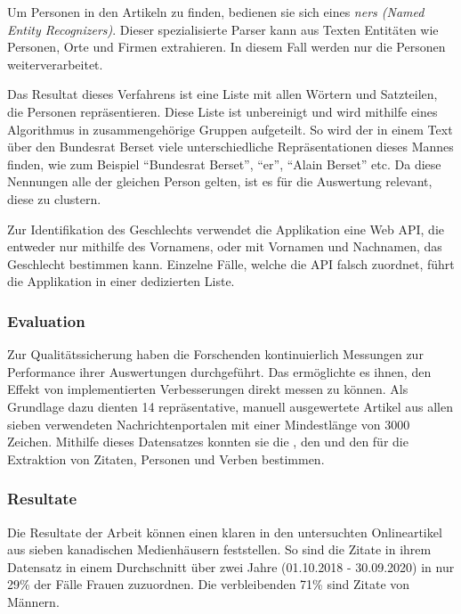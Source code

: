 Um Personen in den Artikeln zu finden, bedienen sie sich eines \textsl{\acrshort{ner}s (\textsl{Named Entity Recognizers})}. Dieser spezialisierte Parser kann aus Texten
Entitäten wie Personen, Orte und Firmen extrahieren. In diesem Fall werden nur die Personen weiterverarbeitet.

Das Resultat dieses Verfahrens ist eine Liste mit allen Wörtern und Satzteilen, die Personen repräsentieren. Diese Liste ist unbereinigt und
wird mithilfe eines  Algorithmus in zusammengehörige Gruppen aufgeteilt. So wird der  in einem Text über den
Bundesrat Berset viele unterschiedliche Repräsentationen dieses Mannes finden, wie zum Beispiel \enquote{Bundesrat Berset}, \enquote{er}, \enquote{Alain Berset}
etc. Da diese Nennungen alle der gleichen Person gelten, ist es für die Auswertung relevant, diese zu clustern.

Zur Identifikation des Geschlechts verwendet die Applikation eine Web API, die entweder nur mithilfe des Vornamens, oder mit Vornamen und Nachnamen, das Geschlecht
bestimmen kann. Einzelne Fälle, welche die API falsch zuordnet, führt die Applikation in einer dedizierten Liste.

\subsubsection{Evaluation}

Zur Qualitätssicherung haben die Forschenden kontinuierlich Messungen zur Performance ihrer Auswertungen durchgeführt. Das ermöglichte es ihnen, den Effekt von implementierten Verbesserungen
direkt messen zu können. Als Grundlage dazu dienten 14 repräsentative, manuell ausgewertete Artikel aus allen sieben verwendeten Nachrichtenportalen mit einer Mindestlänge von 3000 Zeichen.
Mithilfe dieses Datensatzes konnten sie die , den  und den  für die Extraktion von Zitaten, Personen und Verben bestimmen.

\subsubsection{Resultate}
Die Resultate der Arbeit können einen klaren  in den untersuchten
Onlineartikel aus sieben kanadischen Medienhäusern feststellen. So sind die Zitate in ihrem Datensatz
in einem Durchschnitt über zwei Jahre (01.10.2018 - 30.09.2020) in nur 29\% der Fälle Frauen zuzuordnen.
Die verbleibenden 71\% sind Zitate von Männern.

